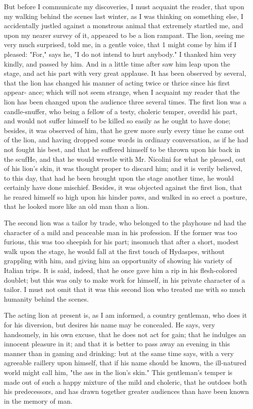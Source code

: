 But before I communicate my discoveries, I must acquaint the reader, that upon my walking behind the scenes last winter, as I was thinking on something else, I accidentally justled against a monstrous animal that extremely startled me, and upon my nearer survey of it, appeared to be a lion rampant. The lion, seeing me very much surprised, told me, in a gentle voice, that 1 might come by him if I pleased: "For," says he, "I do not intend to hurt anybody." I thanked him very kindly, and passed by him. And in a little time after saw him leap upon the stage, and act his part with very great applause. It has been observed by several, that the lion has changed his manner of acting twice or thrice since his first appear- ance; which will not seem strange, when I acquaint my reader that the lion has been changed upon the audience three several times. The first lion was a candle-snuffer, who being a fellow of a testy, choleric temper, overdid his part, and would not suffer himself to be killed so easily as he ought to have done; besides, it was observed of him, that he grew more surly every time he came out of the lion, and having dropped some words in ordinary conversation, as if he had not fought his best, and that he suffered himself to be thrown upon his back in the scufHe, and that he would wrestle with Mr. Nicolini for what he pleased, out of his lion's skin, it was thought proper to discard him; and it is verily believed, to this day, that had he been brought upon the stage another time, he would certainly have done mischief. Besides, it was objected against the first lion, that he reared himself so high upon his hinder paws, and walked in so erect a posture, that he looked more like an old man than a lion.

The second lion was a tailor by trade, who belonged to the playhouse nd had the character of a mild and peaceable man in his profession. If the former was too furious, this was too sheepish for his part; insomuch that after a short, modest walk upon the stage, he would fall at the first touch of Hydaspes, without grappling with him, and giving him an opportunity of showing his variety of Italian trips. It is said, indeed, that he once gave him a rip in his flesh-colored doublet; but this was only to make work for himself, in his private character of a tailor. I must not omit that it was this second lion who treated me with so much humanity behind the scenes.

The acting lion at present is, as I am informed, a country gentleman, who does it for his diversion, but desires his name may be concealed. He says, very handsomely, in his own excuse, that he does not act for gain; that he indulges an innocent pleasure in it; and that it is better to pass away an evening in this manner than in gaming and drinking: but at the same time says, with a very agreeable raillery upon himself, that if his name should be known, the ill-natured world might call him, "the ass in the lion's skin." This gentleman's temper is made out of such a happy mixture of the mild and choleric, that he outdoes both his predecessors, and has drawn together greater audiences than have been known in the memory of man.

